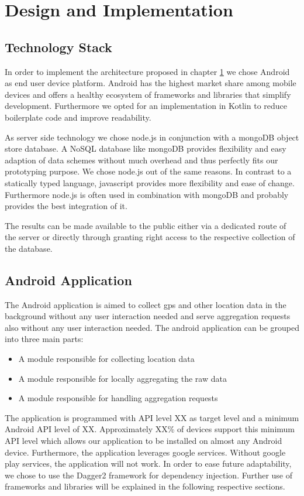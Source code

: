 \chapter{Design and Implementation}\label{chapter:design}

\section{Technology Stack}
In order to implement the architecture proposed in chapter \ref{chapter:design} we chose Android as end user device platform. Android has the highest market share among mobile devices and offers a healthy ecosystem of frameworks and libraries that simplify development. Furthermore we opted for an implementation in Kotlin to reduce boilerplate code and improve readability.

As server side technology we chose node.js in conjunction with a mongoDB object store database. A NoSQL database like mongoDB provides flexibility and easy adaption of data schemes without much overhead and thus perfectly fits our prototyping purpose. We chose node.js out of the same reasons. In contrast to a statically typed language, javascript provides more flexibility and ease of change. Furthermore node.js is often used in combination with mongoDB and probably provides the best integration of it.

The results can be made available to the public either via a dedicated route of the server or directly through granting right access to the respective collection of the database.

\section{Android Application}
The Android application is aimed to collect gps and other location data in the background without any user interaction needed and serve aggregation requests also without any user interaction needed.
The android application can be grouped into three main parts:
\begin{itemize}
	\item A module responsible for collecting location data
	\item A module responsible for locally aggregating the raw data
	\item A module responsible for handling aggregation requests
\end{itemize}
The application is programmed with API level XX as target level and a minimum Android API level of XX. Approximately XX\% of devices support this minimum API level which allows our application to be installed on almost any Android device.
Furthermore, the application leverages google services. Without google play services, the application will not work. In order to ease future adaptability, we chose to use the Dagger2 framework for dependency injection. Further use of frameworks and libraries will be explained in the following respective sections. 

